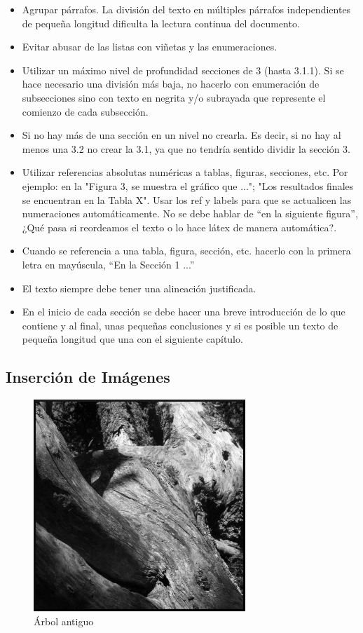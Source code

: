\documentclass{pre-tfg}
\begin{document}
\begin{itemize}
 \item Agrupar párrafos. La división del texto en múltiples párrafos independientes de pequeña longitud dificulta la lectura continua del documento.
\item  Evitar abusar de las listas con viñetas y las enumeraciones.
\item Utilizar un máximo nivel de profundidad secciones de 3 (hasta 3.1.1). Si se hace necesario una división más baja, no hacerlo con enumeración de subsecciones sino con texto en negrita y/o subrayada que represente el comienzo de cada subsección. 
\item  Si no hay más de una sección en un nivel no crearla. Es decir, si no hay al menos una 3.2 no crear la 3.1, ya que no tendría sentido dividir la sección 3.
\item  Utilizar referencias absolutas numéricas a tablas, figuras, secciones, etc. Por ejemplo: en la "Figura 3, se muestra el gráfico que  ..."; "Los resultados finales se encuentran en la Tabla X". Usar los ref y labels para que se actualicen las numeraciones automáticamente. No se debe hablar de ``en la siguiente figura'', ¿Qué pasa si reordeamos el texto o lo hace látex de manera automática?.
\item Cuando se referencia a una tabla, figura, sección, etc. hacerlo con la primera letra en mayúscula, ``En la Sección 1 ...''
\item  El texto siempre debe tener una alineación justificada. 
\item En el inicio de cada sección se debe hacer una breve introducción de lo que contiene y al final, unas pequeñas conclusiones y si es posible un texto de pequeña longitud que una con el siguiente capítulo.
\end{itemize}


\subsection{Inserción de Imágenes}

\begin{figure}[!h]
\centering
   \includegraphics[width=8cm]{figures/tree04.jpg}
\caption{Árbol antiguo}
\end{figure}
\end{document}
